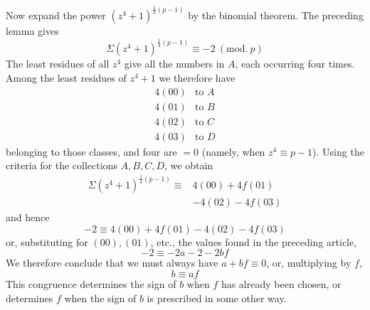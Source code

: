 \newpage{}%
Now expand the power $(z^4+1)^{\frac14(p-1)}$ by the binomial theorem. The preceding lemma gives
\[
\Sigma(z^4+1)^{\frac14(p-1)}\equiv-2\ (\mathrm{mod.}\ p)
\]
The least residues of all $z^4$ give all the numbers in $A$, each occurring four times. Among the least residues of $z^4+1$ we therefore have
\[
\begin{array}{rl}
4(00)&\text{to }A\\
4(01)&\text{to }B\\
4(02)&\text{to }C\\
4(03)&\text{to }D
\end{array}
\]
belonging to those classes, and four are $=0$ (namely, when $z^4\equiv p-1$). Using the criteria for the collections $A,B,C,D$, we obtain
\[
\begin{aligned}
\Sigma(z^4+1)^{\frac14(p-1)}\equiv{}&4(00)+4f(01)\\
&-4(02)-4f(03)
\end{aligned}
\]
and hence
\[
-2\equiv4(00)+4f(01)-4(02)-4f(03)
\]
or, substituting for $(00),(01)$, etc., the values found in the preceding article,
\[
-2\equiv-2a-2-2bf
\]
We therefore conclude that we must always have $a+bf\equiv0$, or, multiplying by $f$,
\[
b\equiv af
\]
This congruence determines the sign of $b$ when $f$ has already been chosen, or determines $f$ when the sign of $b$ is prescribed in some other way.
